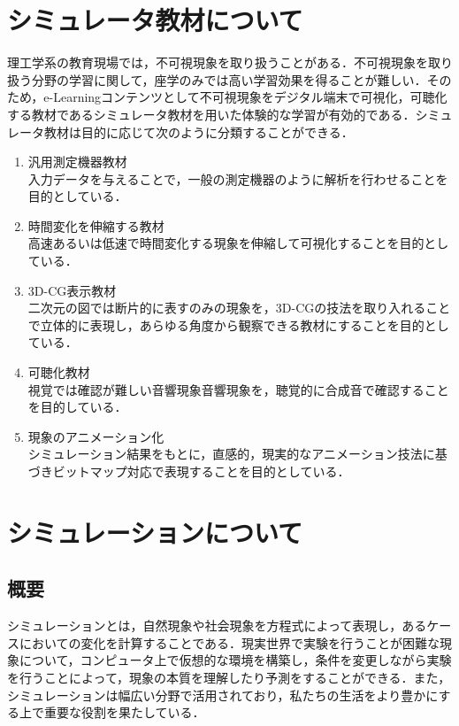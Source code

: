 \documentclass[a4paper, 12pt]{ltjsarticle}
\begin{document}
\section{シミュレータ教材について}
理工学系の教育現場では，不可視現象を取り扱うことがある．不可視現象を取り扱う分野の学習に関して，座学のみでは高い学習効果を得ることが難しい．そのため，e-Learningコンテンツとして不可視現象をデジタル端末で可視化，可聴化する教材であるシミュレータ教材を用いた体験的な学習が有効的である．シミュレータ教材は目的に応じて次のように分類することができる．
\begin{enumerate}
\item 汎用測定機器教材\\
入力データを与えることで，一般の測定機器のように解析を行わせることを目的としている．
\item 時間変化を伸縮する教材\\
高速あるいは低速で時間変化する現象を伸縮して可視化することを目的としている．
\item 3D-CG表示教材\\
二次元の図では断片的に表すのみの現象を，3D-CGの技法を取り入れることで立体的に表現し，あらゆる角度から観察できる教材にすることを目的としている．
\item 可聴化教材\\
視覚では確認が難しい音響現象音響現象を，聴覚的に合成音で確認することを目的している．
\item 現象のアニメーション化\\
シミュレーション結果をもとに，直感的，現実的なアニメーション技法に基づきビットマップ対応で表現することを目的としている．
\end{enumerate}
\clearpage
\section{シミュレーションについて}
\subsection{概要}
シミュレーションとは，自然現象や社会現象を方程式によって表現し，あるケースにおいての変化を計算することである．現実世界で実験を行うことが困難な現象について，コンピュータ上で仮想的な環境を構築し，条件を変更しながら実験を行うことによって，現象の本質を理解したり予測をすることができる．また，シミュレーションは幅広い分野で活用されており，私たちの生活をより豊かにする上で重要な役割を果たしている．
\end{document}

